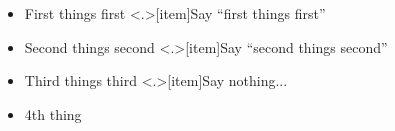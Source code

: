 \begin{frame}
\begin{itemize}[<+->]
\item First things first
\note<.>[item]{Say ``first things first''}
\item Second things second
\note<.>[item]{Say ``second things second''}
\item Third things third
\note<.>[item]{Say nothing...}
\item 4th thing
\end{itemize}
\end{frame}